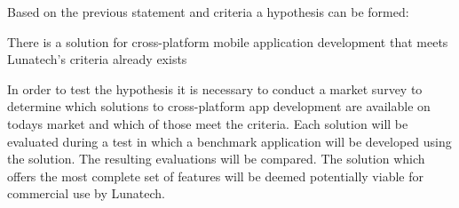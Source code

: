 Based on the previous statement and criteria a hypothesis can be formed:
\begin{shadequote}
There is a solution for cross-platform mobile application development that meets Lunatech's criteria already exists%
\end{shadequote}

%


In order to test the hypothesis it is necessary to conduct a market survey to determine which solutions to cross-platform app development are available on todays market and which of those meet the criteria. Each solution will be evaluated during a test in which a benchmark application will be developed using the solution. The resulting evaluations will be compared. The solution which offers the most complete set of features will be deemed potentially viable for commercial use by Lunatech. 

